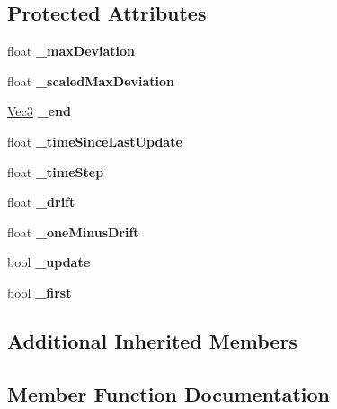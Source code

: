 \subsection*{Protected Attributes}
\begin{DoxyCompactItemize}
\item 
\mbox{\label{classPULineAffector_aec619e981a6924b1ab15b04aae53813b}} 
float {\bfseries \+\_\+max\+Deviation}
\item 
\mbox{\label{classPULineAffector_afa9999f587d1f38ed878b0fd11511daf}} 
float {\bfseries \+\_\+scaled\+Max\+Deviation}
\item 
\mbox{\label{classPULineAffector_ad646b7b51bc09a6366bda4ec13e48a82}} 
\hyperlink{classVec3}{Vec3} {\bfseries \+\_\+end}
\item 
\mbox{\label{classPULineAffector_ac0f8da56de2bf212aa59037838c7dbe7}} 
float {\bfseries \+\_\+time\+Since\+Last\+Update}
\item 
\mbox{\label{classPULineAffector_a9aa8fd1a37ac3be0199b9879e3b2dc44}} 
float {\bfseries \+\_\+time\+Step}
\item 
\mbox{\label{classPULineAffector_a4e74a5f87b22566efc81d0600c7b3eee}} 
float {\bfseries \+\_\+drift}
\item 
\mbox{\label{classPULineAffector_af80ac28351248b515a2c787aab3ad0c1}} 
float {\bfseries \+\_\+one\+Minus\+Drift}
\item 
\mbox{\label{classPULineAffector_a8b639d4db6385dcd6cb832569c67ffce}} 
bool {\bfseries \+\_\+update}
\item 
\mbox{\label{classPULineAffector_a2c9c5df78753d539d3a4901443dd16ee}} 
bool {\bfseries \+\_\+first}
\end{DoxyCompactItemize}
\subsection*{Additional Inherited Members}


\subsection{Member Function Documentation}
\mbox{\label{classPULineAffector_a4fafe8b1cc627879c13d4b098f14635b}} 
